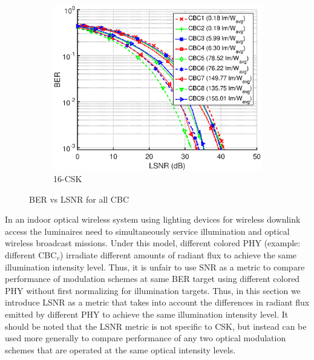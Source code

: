 \documentclass[10pt,letterpaper]{article}
\begin{document}
\begin{figure}[b]
		\vfill
		\begin{subfigure}{0.49\textwidth}
		\centering
			\includegraphics[trim={0.1in 0.0in 0.5in 0.1in}, clip=true, width=\textwidth]{M16_16-CSK_BERvsLSNR_NL.eps}
			\caption{16-CSK}
			\label{fig16LSNR}
		\end{subfigure}
	\caption{BER vs LSNR for all CBC}
	\label{figBERvsLSNR}
\end{figure}

In an indoor optical wireless system using lighting devices for wireless downlink access the luminaires need to simultaneously service illumination and optical wireless broadcast missions. Under this model, different colored PHY (example: different CBC$_{v}$) irradiate different amounts of radiant flux to achieve the same illumination intensity level. Thus, it is unfair to use SNR as a metric to compare performance of modulation schemes at same BER target using different colored PHY without first normalizing for illumination targets. Thus, in this section we introduce LSNR as a metric that takes into account the differences in radiant flux emitted by different PHY to achieve the same illumination intensity level. It should be noted that the LSNR metric is not specific to CSK, but instead can be used more generally to compare performance of any two optical modulation schemes that are operated at the same optical intensity levels.
\end{document}
